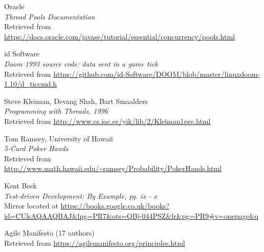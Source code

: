 \documentclass[11pt]{article}
\begin{document}
\begin{thebibliography}{9}
\hypertarget{threadpool}{}
\begin{flushleft}
	Oracle \\
	\textit{Thread Pools Documentation} \\
	Retrieved from \url{https://docs.oracle.com/javase/tutorial/essential/concurrency/pools.html}
\end{flushleft}

\hypertarget{doom_network}{}
\begin{flushleft}
	id Software \\
	\textit{Doom 1993 source code: data sent in a game tick} \\
	Retrieved from \url{https://github.com/id-Software/DOOM/blob/master/linuxdoom-1.10/d_ticcmd.h}
\end{flushleft}

\hypertarget{client_server}{}
\begin{flushleft}
	Steve Kleiman, Devang Shah, Bart Smaalders \\
	\textit{Programming with Threads, 1996} \\
	Retrieved from \url{http://www.cs.ioc.ee/yik/lib/2/Kleiman1pre.html}
\end{flushleft}

\hypertarget{str_uncommon}{}
\begin{flushleft}
	Tom Ramsey, University of Hawaii \\
	\textit{5-Card Poker Hands} \\
	Retrieved from \url{http://www.math.hawaii.edu/~ramsey/Probability/PokerHands.html}
\end{flushleft}

\begin{flushleft}
	Kent Beck \\
	\textit{Test-driven Development: By Example, pg. ix - x} \\
	Mirror located at \url{https://books.google.co.uk/books?id=CUlsAQAAQBAJ&lpg=PR7&ots=QBj-044PSZ&lr&pg=PR9#v=onepage&q}
\end{flushleft}

\begin{flushleft}
	Agile Manifesto (17 authors) \\
	Retrieved from \url{https://agilemanifesto.org/principles.html}
\end{flushleft}


\end{thebibliography}
\end{document}

